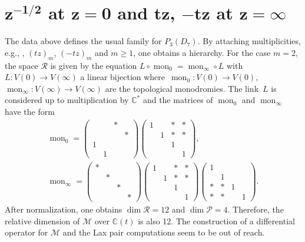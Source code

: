 \documentclass[pdftex]{sigma}
\numberwithin{equation}{section}
\begin{document}
\section[1/sqrt(z) at z=0 and tz, -tz at z=infty]{$\boldsymbol{z^{-1/2}}$ at $\boldsymbol{z=0}$ and $\boldsymbol{tz}$, $\boldsymbol{-tz}$ at $\boldsymbol{z=\infty }$}\label{sec12}
The data above defines the usual family for $P_3(D_7)$. By attaching multiplicities, e.g., , $(tz)_m$, $(-tz)_m$ and $m\geq 1$,
one obtains a hierarchy. For the case $m=2$, the space $\mathcal{R}$ is given by the equation
$L\circ \operatorname{mon}_0=\operatorname{mon}_{\infty}\circ L$ with $ L\colon V(0)\rightarrow V(\infty)$ a linear bijection
where~${\operatorname{mon}_0\colon V(0)\rightarrow V(0)}$, $ \operatorname{mon}_{\infty}\colon V(\infty )\rightarrow V(\infty) $ are
the topological monodromies. The link~$L$ is considered up to multiplication by $\mathbb{C}^*$
and the matrices of $\operatorname{mon}_0$ and $\operatorname{mon}_{\infty}$ have the form
\begin{gather*}
\operatorname{mon}_0= \begin{pmatrix} & & * & \\ & & &* \\ 1& & & \\ & 1& & \end{pmatrix}
\begin{pmatrix} 1& & * & *\\ & 1& *& *\\ & & 1& \\ & & &1 \end{pmatrix}, \\
\operatorname{mon}_{\infty}=\begin{pmatrix} *& & & \\ & *& & \\ & & *& \\ & & & *\end{pmatrix}
\begin{pmatrix} 1& &* &* \\ & 1& * & *\\ & & 1& \\ & & &1 \end{pmatrix}
\begin{pmatrix} 1& & & \\ & 1& & \\ *&* & 1& \\ *& *& &1 \end{pmatrix}.\end{gather*}
After normalization, one obtains $\dim \mathcal{R}=12$ and $\dim \mathcal{P}=4$. Therefore, the relative dimension
of $\mathcal{M}$ over $\mathbb{C}(t)$ is also 12. The construction of a differential operator for
 $\mathcal{M}$ and the Lax pair computations
seem to be out of reach.
\end{document}
